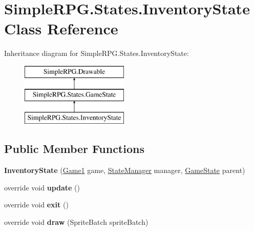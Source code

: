 \hypertarget{class_simple_r_p_g_1_1_states_1_1_inventory_state}{\section{Simple\-R\-P\-G.\-States.\-Inventory\-State Class Reference}
\label{class_simple_r_p_g_1_1_states_1_1_inventory_state}
}
Inheritance diagram for Simple\-R\-P\-G.\-States.\-Inventory\-State\-:\begin{figure}[H]
\begin{center}
\leavevmode
\includegraphics[height=3.000000cm]{class_simple_r_p_g_1_1_states_1_1_inventory_state}
\end{center}
\end{figure}
\subsection*{Public Member Functions}
\begin{DoxyCompactItemize}
\item 
\hypertarget{class_simple_r_p_g_1_1_states_1_1_inventory_state_a7fc2a36607eab5830a3e8456d88f4de1}{{\bfseries Inventory\-State} (\hyperlink{class_simple_r_p_g_1_1_game1}{Game1} game, \hyperlink{class_simple_r_p_g_1_1_states_1_1_state_manager}{State\-Manager} manager, \hyperlink{class_simple_r_p_g_1_1_states_1_1_game_state}{Game\-State} parent)}\label{class_simple_r_p_g_1_1_states_1_1_inventory_state_a7fc2a36607eab5830a3e8456d88f4de1}

\item 
\hypertarget{class_simple_r_p_g_1_1_states_1_1_inventory_state_a87827673a8facbdc18bbe4de68eb250b}{override void {\bfseries update} ()}\label{class_simple_r_p_g_1_1_states_1_1_inventory_state_a87827673a8facbdc18bbe4de68eb250b}

\item 
\hypertarget{class_simple_r_p_g_1_1_states_1_1_inventory_state_a1632dd2d7dba038d8416130ef4e7e643}{override void {\bfseries exit} ()}\label{class_simple_r_p_g_1_1_states_1_1_inventory_state_a1632dd2d7dba038d8416130ef4e7e643}

\item 
\hypertarget{class_simple_r_p_g_1_1_states_1_1_inventory_state_a1a7b78358df3cc6c9e21084195f1c99e}{override void {\bfseries draw} (Sprite\-Batch sprite\-Batch)}\label{class_simple_r_p_g_1_1_states_1_1_inventory_state_a1a7b78358df3cc6c9e21084195f1c99e}

\end{DoxyCompactItemize}
